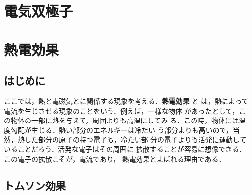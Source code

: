﻿%
    \section{電気双極子}

    \section{熱電効果}
        \subsection{はじめに}
            ここでは，熱と電磁気とに関係する現象を考える．\textbf{熱電効果} と
            は，熱によって電流を生じさせる現象のことをいう．例えば，一様な物体
            があったとして，この物体の一部に熱を与えて，周囲よりも高温にしてみ
            る．この時，物体には温度勾配が生じる．熱い部分のエネルギーは冷たい
            う部分よりも高いので，当然，熱した部分の原子の持つ電子も，冷たい部
            分の電子よりも活発に運動していることだろう．活発な電子はその周囲に
            拡散することが容易に想像できる．この電子の拡散こそが，電流であり，
            熱電効果とよばれる理由である．

        \subsection{トムソン効果}\label{subsec:ThomsonEffect}

